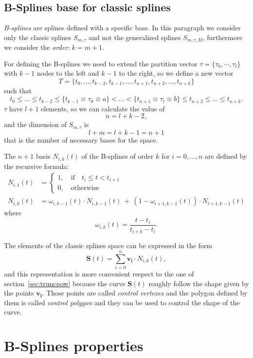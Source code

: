 \documentclass[dissertation.tex]{subfiles}
\begin{document}
\subsection{B-Splines base for classic splines}\label{sec:bsplines}
\emph{B-splines} are splines defined with a specific base. In this
paragraph we consider only the classic splines $S_{m,\tau}$ and not
the generalized splines $S_{m,\tau,M}$, furthermore we consider the
\emph{order}: $k=m+1$.

For defining the B-splines we need to extend the partition vector
$\tau=\{\tau_0,\cdots,\tau_l\}$ with $k-1$ nodes to the left and $k-1$ to
the right, so we define a new vector
$$
T=\{t_0,\dots,t_{k-2},t_{k-1},\dots,t_{n+1},t_{n+2},\dots,t_{n+k}\}
$$
such that
$$
t_0\leq\dots\leq t_{k-2}\leq \{t_{k-1}\equiv\tau_0\equiv a\}<\dots<
\{t_{n+1}\equiv\tau_l\equiv b\}\leq t_{n+2}\leq\dots\leq t_{n+k}.
$$
$\tau$ have $l+1$ elements, so we can calculate the value of
$$
n=l+k-2,
$$
and the dimension of $S_{m,\tau}$ is
$$
l+m=l+k-1=n+1
$$
that is the number of necessary bases for the space.

The $n+1$ basis $N_{i,k}(t)$ of the B-splines of order $k$ for
$i=0,\dots,n$ are defined by the 
recursive formula:
\begin{align*}
  N_{i,1}(t) &=
  \begin{cases}
    1,\quad \mbox{if}\quad t_i\leq t<t_{i+1}\\
    0,\quad \mbox{otherwise}
  \end{cases}\\
  N_{i,k}(t) &= \omega_{i,k-1}(t)\cdot N_{i,k-1}(t)\ +\
  (1-\omega_{i+1,k-1}(t))\cdot N_{i+1,k-1}(t)
\end{align*}
where
$$
\omega_{i,k}(t) = \frac{t-t_i}{t_{i+k}-t_i}.
$$

The elements of the classic splines space can be expressed in the form
$$
\mathbf{S}(t)=\sum_{i=0}^n\mathbf{v_i}\cdot N_{i,k}(t),
$$
and this representation is more convenient respect to the one of
section~\ref{sec:truncpow} because the curve $\mathbf{S}(t)$ roughly
follow the shape given by the points $\mathbf{v_i}$. Those points are
called \emph{control vertexes} and the polygon defined by them is
called \emph{control polygon} and they can be used to control the
shape of the curve.

\section{B-Splines properties}
\end{document}
